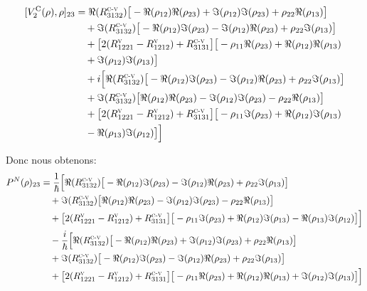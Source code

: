 \documentclass[12pt,a4paper,openany,oneside]{book}
\begin{document}
{{{{{{\begin{eqnarray*}
\begin{split}
[V_{2}^{\textrm{C}}(\rho),\rho]_{23}&= \Re(R^{\textsc{c-v}}_{3132})\big[-\Re(\rho_{12})\Re(\rho_{23})+\Im(\rho_{12})\Im(\rho_{23})+\rho_{22}\Re(\rho_{13})\big]\\
&\quad +\Im(R^{\textsc{c-v}}_{3132})\big[-\Re(\rho_{12})\Im(\rho_{23})-\Im(\rho_{12})\Re(\rho_{23})+\rho_{22}\Im(\rho_{13})\big]\\
&\quad +\big[2(R^{\textsc{v}}_{1221}-R^{\textsc{v}}_{1212})+R^{\textsc{c-v}}_{3131}\big]\big[-\rho_{11}\Re(\rho_{23})+\Re(\rho_{12})\Re(\rho_{13})\\
&\quad +\Im(\rho_{12})\Im(\rho_{13})\big]\\
&\quad +i\Big[\Re(R^{\textsc{c-v}}_{3132})\big[-\Re(\rho_{12})\Im(\rho_{23})-\Im(\rho_{12})\Re(\rho_{23})+\rho_{22}\Im(\rho_{13})\big]\\
&\quad +\Im(R^{\textsc{c-v}}_{3132})\big[\Re(\rho_{12})\Re(\rho_{23})-\Im(\rho_{12})\Im(\rho_{23})-\rho_{22}\Re(\rho_{13})\big]\\
&\quad +\big[2(R^{\textsc{v}}_{1221}-R^{\textsc{v}}_{1212})+R^{\textsc{c-v}}_{3131}\big]\big[-\rho_{11}\Im(\rho_{23})+\Re(\rho_{12})\Im(\rho_{13})\\
& \quad -\Re(\rho_{13})\Im(\rho_{12})\big] \Big]
\end{split}
\end{eqnarray*}

Donc nous obtenons:
\begin{eqnarray*}
\begin{split}
P^{N}(\rho)_{23}&= \dfrac{1}{\hbar}\Big[\Re(R^{\textsc{c-v}}_{3132})\big[-\Re(\rho_{12})\Im(\rho_{23})-\Im(\rho_{12})\Re(\rho_{23})+\rho_{22}\Im(\rho_{13})\big]\\
&\quad +\Im(R^{\textsc{c-v}}_{3132})\big[\Re(\rho_{12})\Re(\rho_{23})-\Im(\rho_{12})\Im(\rho_{23})-\rho_{22}\Re(\rho_{13})\big]\\
&\quad +\big[2(R^{\textsc{v}}_{1221}-R^{\textsc{v}}_{1212})+R^{\textsc{c-v}}_{3131}\big]\big[-\rho_{11}\Im(\rho_{23})+\Re(\rho_{12})\Im(\rho_{13})-\Re(\rho_{13})\Im(\rho_{12})\big] \Big]\\
&\quad -\dfrac{i}{\hbar}\Big[\Re(R^{\textsc{c-v}}_{3132})\big[-\Re(\rho_{12})\Re(\rho_{23})+\Im(\rho_{12})\Im(\rho_{23})+\rho_{22}\Re(\rho_{13})\big]\\
&\quad +\Im(R^{\textsc{c-v}}_{3132})\big[-\Re(\rho_{12})\Im(\rho_{23})-\Im(\rho_{12})\Re(\rho_{23})+\rho_{22}\Im(\rho_{13})\big]\\
&\quad +\big[2(R^{\textsc{v}}_{1221}-R^{\textsc{v}}_{1212})+R^{\textsc{c-v}}_{3131}\big]\big[-\rho_{11}\Re(\rho_{23})+\Re(\rho_{12})\Re(\rho_{13})+\Im(\rho_{12})\Im(\rho_{13})\big]\Big]
\end{split}
\end{eqnarray*}

}}}}}}
\end{document}
